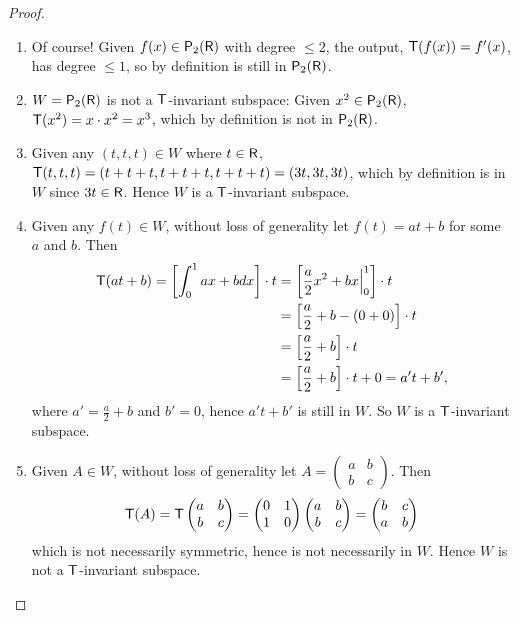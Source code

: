 \begin{proof} \ 

\begin{enumerate}
\item Of course! Given \(f(x) \in \textsf{P}_2(\textsf{R})\) with degree \(\le 2\), the output, \(\textsf{T}(f(x)) = f'(x)\), has degree \(\le 1\), so by definition is still in \(\textsf{P}_2(\textsf{R})\).

\item \(W = \textsf{P}_2(\textsf{R})\) is not a \(\textsf{T}\)-invariant subspace: Given \(x^2 \in \textsf{P}_2(\textsf{R})\), \(\textsf{T}(x^2) = x \cdot x^2 = x^3\), which by definition is not in \(\textsf{P}_2(\textsf{R})\).

\item Given any \((t, t, t) \in W\) where \(t \in \textsf{R}\), \(\textsf{T}(t, t, t) = (t + t + t, t + t + t, t + t + t) = (3t, 3t, 3t)\), which by definition is in \(W\) since \(3t \in \textsf{R}\).
Hence \(W\) is a \(\textsf{T}\)-invariant subspace.

\item Given any \(f(t) \in W\), without loss of generality let \(f(t) = at + b\) for some \(a\) and \(b\).
Then
\begin{align*}
    \textsf{T}(at + b) = \left[ \int_0^1 ax + b dx \right] \cdot t
    & = \left[ \frac{a}{2} x^2 + bx \Big|_0^1 \right] \cdot t \\
    & = \left[ \frac{a}{2} + b - (0 + 0) \right] \cdot t \\
    & = \left[ \frac{a}{2} + b \right] \cdot t \\
    & = \left[ \frac{a}{2} + b \right] \cdot t + 0 = a't + b',
\end{align*}
where \(a' = \frac{a}{2} + b\) and \(b' = 0\), hence \(a't + b'\) is still in \(W\).
So \(W\) is a \(\textsf{T}\)-invariant subspace.

\item Given \(A \in W\), without loss of generality let \(A = \begin{pmatrix} a & b \\ b & c \end{pmatrix}\).
Then
\begin{align*}
    \textsf{T}(A) = \textsf{T} \begin{pmatrix} a & b \\ b & c \end{pmatrix}
          = \begin{pmatrix} 0 & 1 \\ 1 & 0 \end{pmatrix} \begin{pmatrix} a & b \\ b & c \end{pmatrix}
          = \begin{pmatrix} b & c \\ a & b \end{pmatrix}
\end{align*}
which is not necessarily symmetric, hence is not necessarily in \(W\).
Hence \(W\) is not a \(\textsf{T}\)-invariant subspace.
\end{enumerate}
\end{proof}

